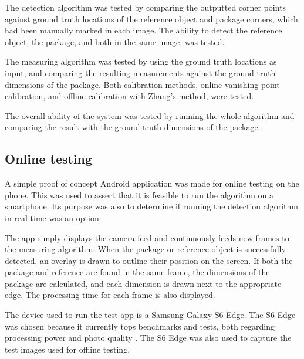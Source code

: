 The detection algorithm was tested by comparing the outputted corner points against ground truth locations of the reference object and package corners, which had been manually marked in each image.
The ability to detect the reference object, the package, and both in the same image, was tested.

The measuring algorithm was tested by using the ground truth locations as input, and comparing the resulting measurements against the ground truth dimensions of the package.
Both calibration methods, online vanishing point calibration, and offline calibration with Zhang's method, were tested.

The overall ability of the system was tested by running the whole algorithm and comparing the result with the ground truth dimensions of the package. 


\subsection{Online testing} \label{method:online_testing}
A simple proof of concept Android application was made for online testing on the phone.
This was used to assert that it is feasible to run the algorithm on a smartphone.
Its purpose was also to determine if running the detection algorithm in real-time was an option.

The app simply displays the camera feed and continuously feeds new frames to the measuring algorithm.
When the package or reference object is successfully detected, an overlay is drawn to outline their position on the screen.
If both the package and reference are found in the same frame, the dimensions of the package are calculated, and each dimension is drawn next to the appropriate edge.
The processing time for each frame is also displayed.

The device used to run the test app is a Samsung Galaxy S6 Edge.
The S6 Edge was chosen because it currently tops benchmarks and tests, both regarding processing power and photo quality \cite{phone_performance_benchmark}\cite{phone_camera_benchmark}.
The S6 Edge was also used to capture the test images used for offline testing.










